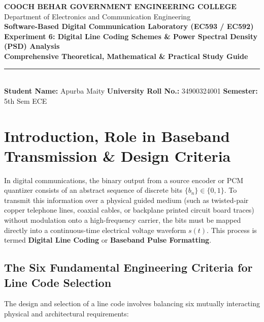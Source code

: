 \documentclass[11pt,a4paper]{article}
\begin{document}
\begin{center}
{\Large \textbf{\textcolor{primary}{COOCH BEHAR GOVERNMENT ENGINEERING COLLEGE}}}\\[1.5mm]
{\large Department of Electronics and Communication Engineering}\\[2.5mm]
{\Large \textbf{\textcolor{secondary}{Software-Based Digital Communication Laboratory (EC593 / EC592)}}}\\[2mm]
{\LARGE \textbf{Experiment 6: Digital Line Coding Schemes \& Power Spectral Density (PSD) Analysis}}\\[2mm]
{\large \textbf{Comprehensive Theoretical, Mathematical \& Practical Study Guide}}\\[2.5mm]
\rule{\linewidth}{1.0pt}\\[2mm]
\small \textbf{Student Name:} Apurba Maity \quad \textbf{University Roll No.:} 34900324001 \quad \textbf{Semester:} 5th Sem ECE
\end{center}

\vspace{3mm}

\section{Introduction, Role in Baseband Transmission \& Design Criteria}
In digital communications, the binary output from a source encoder or PCM quantizer consists of an abstract sequence of discrete bits $\{b_n\} \in \{0, 1\}$. To transmit this information over a physical guided medium (such as twisted-pair copper telephone lines, coaxial cables, or backplane printed circuit board traces) without modulation onto a high-frequency carrier, the bits must be mapped directly into a continuous-time electrical voltage waveform $s(t)$. This process is termed \textbf{Digital Line Coding} or \textbf{Baseband Pulse Formatting}.

\subsection{The Six Fundamental Engineering Criteria for Line Code Selection}
The design and selection of a line code involves balancing six mutually interacting physical and architectural requirements:
\end{document}
